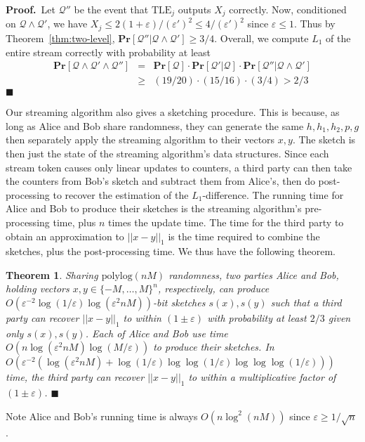 \documentclass[letterpaper,11pt]{article}
\newcommand{\polylog}{{\mathrm{polylog}}}
\newcommand{\eps}{\varepsilon}
\newcommand{\TLE}{\mathrm{TLE}}
\renewcommand{\Pr}{\mathbf{Pr}}
\newcommand{\TheoremName}[1]{\label{thm:#1}}
\newcommand{\Theorem}[1]{Theorem~\ref{thm:#1}}
\newtheorem{theorem}{Theorem}\newtheorem{corollary}[theorem]{Corollary}
\newcommand{\proofbelow}{3pt}
\newcommand{\afterproof}{\hfill $\blacksquare$ \par \vspace{\proofbelow}}
\renewenvironment{proof}{\noindent\textbf{Proof.}\,}{\afterproof}
\begin{document}
\begin{proof}
Let $\mathcal{Q}''$ be the event that $\TLE_j$ outputs $X_j$
correctly. Now, conditioned on
$\mathcal{Q}\wedge\mathcal{Q}'$, we have $X_j \le 2(1+\eps)/(\eps')^2
\le
4/(\eps')^2$ since $\eps \le 1$.  Thus by \Theorem{two-level},
$\Pr[\mathcal{Q}''|\mathcal{Q}\wedge \mathcal{Q}'] \ge 3/4$. Overall,
we compute
$L_1$ of the entire stream correctly with probability at least
\begin{eqnarray*}
\Pr[\mathcal{Q}\wedge \mathcal{Q}' \wedge \mathcal{Q}''] &=&
\Pr[\mathcal{Q}]\cdot \Pr[\mathcal{Q}'|\mathcal{Q}] \cdot
\Pr[\mathcal{Q}''|\mathcal{Q}\wedge \mathcal{Q}']\\
&\ge& (19/20)\cdot
(15/16)\cdot (3/4) > 2/3
\end{eqnarray*}
\end{proof}

Our streaming algorithm also gives a sketching procedure. This is
because, as long as Alice and Bob share randomness, they can generate
the same $h,h_1,h_2,p,g$ then separately apply the streaming
algorithm to their vectors $x,y$. The sketch is then just the state of
the
streaming algorithm's data structures.  Since each stream token causes
only linear updates to counters, a third party
can then take the counters from Bob's sketch and subtract them from
Alice's, then do post-processing to recover the estimation of the
$L_1$-difference. The running time for Alice and Bob to produce their
sketches is the streaming algorithm's pre-processing time, plus $n$
times the update time. The time for the third party to obtain an
approximation to $||x-y||_1$ is the time required to combine the
sketches, plus the post-processing time.  We thus
have the following theorem.

\begin{theorem}\TheoremName{sketching}
Sharing $\polylog(nM)$ randomness, two parties Alice and Bob,
holding vectors $x,y\in\{-M,\ldots,M\}^n$, respectively, can produce
$O(\eps^{-2}\log(1/\eps)\log(\eps^2 nM))$-bit sketches $s(x),s(y)$
such that a third party can recover $||x-y||_1$ to within $(1 \pm \eps)$
with probability at
least $2/3$ given only $s(x),s(y)$.  Each of Alice and Bob use
time $O(n\log(\eps^2 nM)\log(M/\eps))$ to produce their sketches. In
$O(\eps^{-2}(\log(\eps^2 nM)
+\log(1/\eps)\log\log(1/\eps)\log\log\log(1/\eps)))$ time,
the third party can recover $||x-y||_1$ to within a multiplicative
factor of $(1 \pm \eps)$. \afterproof
\end{theorem}

Note Alice and Bob's running time is
always $O(n\log^2(nM))$ since $\eps\ge 1/\sqrt{n}$.
\end{document}
